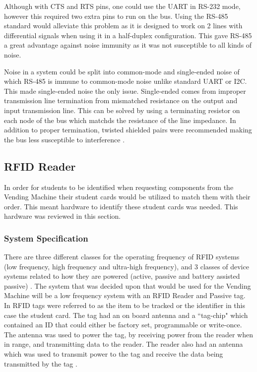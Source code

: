 \documentclass[a4paper,11pt]{article}
\numberwithin{figure}{section}
\numberwithin{table}{section}
\begin{document}
Although with CTS and RTS pins, one could use the UART in RS-232 mode, however this required two extra pins to run on the bus. Using the RS-485 standard would alleviate this problem as it is designed to work on 2 lines with differential signals when using it in a half-duplex configuration. This gave RS-485 a great advantage against noise immunity as it was not susceptible to all kinds of noise. 

Noise in a system could be split into common-mode and single-ended noise of which RS-485 is immune to common-mode noise unlike standard UART or I2C. This made single-ended noise the only issue. Single-ended comes from improper transmission line termination from mismatched resistance on the output and input transmission line. This can be solved by using a terminating resistor on each node of the bus which matchds the resistance of the line impedance. In addition to proper termination, twisted shielded pairs were recommended making the bus less susceptible to interference \cite{dif}. 

\subsection{RFID Reader}
In order for students to be identified when requesting components from the Vending Machine their student cards would be utilized to match them with their order. This meant hardware to identify these student cards was needed. This hardware was reviewed in this section.

\subsubsection{System Specification}
There are three different classes for the operating frequency of RFID systems (low frequency, high frequency and ultra-high frequency), and 3 classes of device systems related to how they are powered (active, passive and battery assisted passive) \cite{rfidsys}. The system that was decided upon that would be used for the Vending Machine will be a low frequency system with an RFID Reader and Passive tag. In RFID tags were referred to as the item to be tracked or the identifier in this case the student card. The tag had an on board antenna and a ``tag-chip" which contained an ID that could either be factory set, programmable or write-once. The antenna was used to power the tag, by receiving power from the reader when in range, and transmitting data to the reader. The reader also had an antenna which was used to transmit power to the tag and receive the data being transmitted by the tag \cite{rfidhow}.
\end{document}
